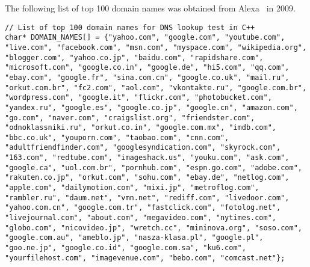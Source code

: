 \startappendices
{}
\label{app:dns}

The following list of top 100 domain names was obtained from Alexa~\cite{alexa} in 2009.

\lstset{language=C++}
\begin{lstlisting}
// List of top 100 domain names for DNS lookup test in C++
char* DOMAIN_NAMES[] = {"yahoo.com", "google.com", "youtube.com", "live.com", "facebook.com", "msn.com", "myspace.com", "wikipedia.org", "blogger.com", "yahoo.co.jp", "baidu.com", "rapidshare.com", "microsoft.com", "google.co.in", "google.de", "hi5.com", "qq.com", "ebay.com", "google.fr", "sina.com.cn", "google.co.uk", "mail.ru", "orkut.com.br", "fc2.com", "aol.com", "vkontakte.ru", "google.com.br", "wordpress.com", "google.it", "flickr.com", "photobucket.com", "yandex.ru", "google.es", "google.co.jp", "google.cn", "amazon.com", "go.com", "naver.com", "craigslist.org", "friendster.com", "odnoklassniki.ru", "orkut.co.in", "google.com.mx", "imdb.com", "bbc.co.uk", "youporn.com", "taobao.com", "cnn.com", "adultfriendfinder.com", "googlesyndication.com", "skyrock.com", "163.com", "redtube.com", "imageshack.us", "youku.com", "ask.com", "google.ca", "uol.com.br", "pornhub.com", "espn.go.com", "adobe.com", "rakuten.co.jp", "orkut.com", "sohu.com", "ebay.de", "netlog.com", "apple.com", "dailymotion.com", "mixi.jp", "metroflog.com", "rambler.ru", "daum.net", "vmn.net", "rediff.com", "livedoor.com", "yahoo.com.cn", "google.com.tr", "fastclick.com", "fotolog.net", "livejournal.com", "about.com", "megavideo.com", "nytimes.com", "globo.com", "nicovideo.jp", "wretch.cc", "mininova.org", "soso.com", "google.com.au", "ameblo.jp", "nasza-klasa.pl", "google.pl", "goo.ne.jp", "google.co.id", "google.com.sa", "ku6.com", "yourfilehost.com", "imagevenue.com", "bebo.com", "comcast.net"};
\end{lstlisting}
